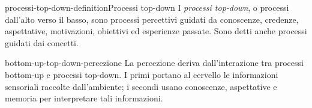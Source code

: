 \documentclass[preview]{standalone}
\begin{document}
\begin{snippetdefinition}{processi-top-down-definition}{Processi top-down}
    I \emph{processi top-down}, o processi dall'alto verso il basso, sono
    processi percettivi guidati da conoscenze, credenze, aspettative,
    motivazioni, obiettivi ed esperienze passate. Sono detti anche processi
    guidati dai concetti.
\end{snippetdefinition}

\begin{snippet}{bottom-up-top-down-percezione}
    La percezione deriva dall'interazione tra processi bottom-up e processi
    top-down. I primi portano al cervello le informazioni sensoriali raccolte
    dall'ambiente; i secondi usano conoscenze, aspettative e memoria per
    interpretare tali informazioni.
\end{snippet}

\end{document}

